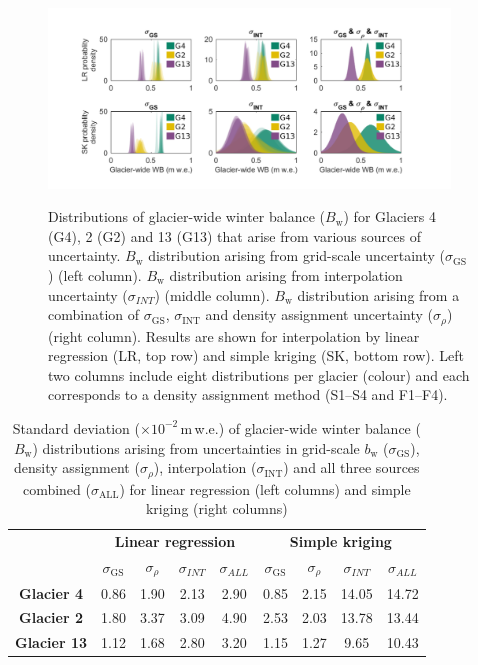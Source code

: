 \documentclass[twocolumn, letterpaper]{igs}
\begin{document}
\begin{figure}
	\centering
	\includegraphics[width =0.95\textwidth]{WSMBDist.pdf}\\
	\caption{Distributions of glacier-wide winter balance ($B_\mathrm{w}$) for Glaciers 4 (G4), 2 (G2) and 13 (G13) that arise from various sources of uncertainty. $B_\mathrm{w}$ distribution arising from grid-scale uncertainty ($\sigma_{\mathrm{GS}}$) (left column). $B_\mathrm{w}$ distribution arising from interpolation uncertainty ($\sigma_{INT}$) (middle column). $B_\mathrm{w}$ distribution arising from a combination of $\sigma_{\mathrm{GS}}$, $\sigma_{\mathrm{INT}}$ and density assignment uncertainty ($\sigma_{\rho}$) (right column). Results are shown for interpolation by linear regression (LR, top row) and simple kriging (SK, bottom row). Left two columns include eight distributions per glacier (colour) and each corresponds to a density assignment method (S1--S4 and F1--F4).}
	\label{fig:WSMBDist_LR}
\end{figure}

\begin{table}[]
\centering
\caption{Standard deviation ($\times10^{-2}$\,m\,w.e.) of glacier-wide winter balance ($B_\mathrm{w}$) distributions arising from uncertainties in grid-scale $b_\mathrm{w}$ ($\sigma_{\mathrm{GS}}$), density assignment ($\sigma_{\rho}$), interpolation ($\sigma_{\mathrm{INT}}$) and all three sources combined ($\sigma_{\mathrm{ALL}}$) for linear regression (left columns) and simple kriging (right columns)}
\label{tab:WSMBdistribution_sigma}
\begin{tabular}{c|cccc|cccc}
 & \multicolumn{4}{c|}{\textbf{Linear regression}} & \multicolumn{4}{c}{\textbf{Simple kriging}} \\
\textbf{} & $\sigma_{\mathrm{GS}}$ & $\sigma_{\rho}$ & $\sigma_{INT}$ & $\sigma_{ALL}$ & $\sigma_{\mathrm{GS}}$ & $\sigma_{\rho}$ & $\sigma_{INT}$ & $\sigma_{ALL}$ \\ \hline
\textbf{Glacier 4} & 0.86 & 1.90 & 2.13 & 2.90 & 0.85 & 2.15 & 14.05 & 14.72 \\
\textbf{Glacier 2} & 1.80 & 3.37 & 3.09 & 4.90 & 2.53 & 2.03 & 13.78 & 13.44 \\
\textbf{Glacier 13} & 1.12 & 1.68 & 2.80 & 3.20 & 1.15 & 1.27 & 9.65 & 10.43
\end{tabular}
\end{table}
\end{document}
